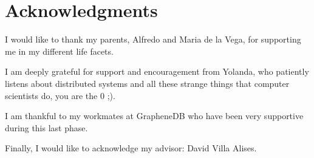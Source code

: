 \chapter{Acknowledgments}

I would like to thank my parents, Alfredo and Maria de la Vega, for supporting
me in my different life facets.

I am deeply grateful for support and encouragement from Yolanda, who patiently
listens about distributed systems and all these strange things that computer
scientists do, you are the 0 ;).

I am thankful to my workmates at GrapheneDB who have been very supportive during
this last phase.

Finally, I would like to acknowledge my advisor: David Villa Alises.
